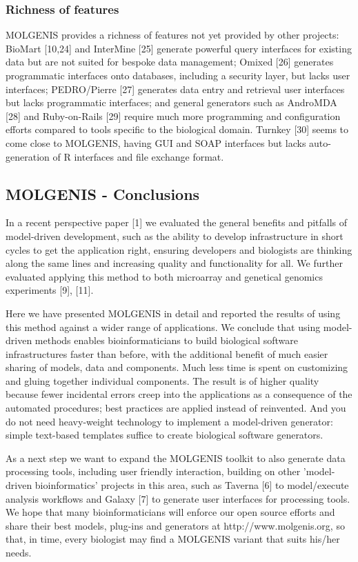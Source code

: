 \documentclass[8pt, twoside, a5paper]{report}
\begin{document}
\subsubsection{Richness of features}

MOLGENIS provides a richness of features not yet provided by other projects: BioMart [10,24] and InterMine [25] generate 
powerful query interfaces for existing data but are not suited for bespoke data management; Omixed [26] generates 
programmatic interfaces onto databases, including a security layer, but lacks user interfaces; PEDRO/Pierre [27] generates 
data entry and retrieval user interfaces but lacks programmatic interfaces; and general generators such as AndroMDA [28] and 
Ruby-on-Rails [29] require much more programming and configuration efforts compared to tools specific to the biological 
domain. Turnkey [30] seems to come close to MOLGENIS, having GUI and SOAP interfaces but lacks auto-generation of R 
interfaces and file exchange format. 

\subsection{MOLGENIS - Conclusions}

In a recent perspective paper [1] we evaluated the general benefits and pitfalls of model-driven development, such as 
the ability to develop infrastructure in short cycles to get the application right, ensuring developers and biologists 
are thinking along the same lines and increasing quality and functionality for all. We further evaluated applying this 
method to both microarray and genetical genomics experiments [9], [11].

Here we have presented MOLGENIS in detail and reported the results of using this method against a wider range of 
applications. We conclude that using model-driven methods enables bioinformaticians to build biological software 
infrastructures faster than before, with the additional benefit of much easier sharing of models, data and components. 
Much less time is spent on customizing and gluing together individual components. The result is of higher quality 
because fewer incidental errors creep into the applications as a consequence of the automated procedures; best practices 
are applied instead of reinvented. And you do not need heavy-weight technology to implement a model-driven generator: 
simple text-based templates suffice to create biological software generators.

As a next step we want to expand the MOLGENIS toolkit to also generate data processing tools, including user friendly 
interaction, building on other 'model-driven bioinformatics' projects in this area, such as Taverna [6] to model/execute 
analysis workflows and Galaxy [7] to generate user interfaces for processing tools. We hope that many bioinformaticians 
will enforce our open source efforts and share their best models, plug-ins and generators at http://www.molgenis.org, 
so that, in time, every biologist may find a MOLGENIS variant that suits his/her needs.
\end{document}

